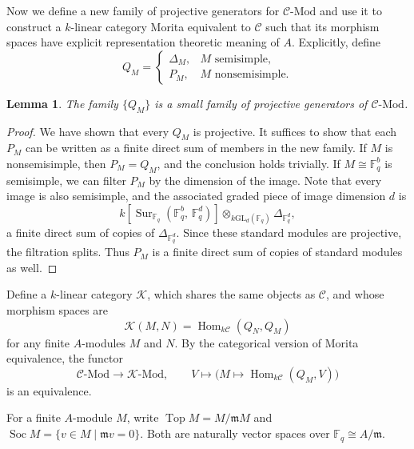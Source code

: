 \documentclass[10pt, reqno]{amsart}
\theoremstyle{plain}
\newtheorem{lemma}[theorem]{Lemma}
\numberwithin{equation}{section}
\theoremstyle{definition}
\newcommand{\Hom}{\operatorname{Hom}}
\newcommand{\Sur}{\operatorname{Sur}}
\newcommand{\Soc}{\operatorname{Soc}}
\newcommand{\Top}{\operatorname{Top}}
\newcommand{\Mod}{{\textrm{-}\mathrm{Mod}}}
\newcommand{\C}{\mathscr C}
\newcommand{\K}{\mathcal K}
\begin{document}
Now we define a new family of projective generators for $\C \Mod$ and use it to construct a $k$-linear category Morita equivalent to $\C$ such that its morphism spaces have explicit representation theoretic meaning of $A$. Explicitly, define
\[
Q_M=
\begin{cases}
\Delta_M, & M\text{ semisimple},\\
P_M, & M \text{ nonsemisimple}.
\end{cases}
\]

\begin{lemma} \label{lem:Q-generators}
The family $\{Q_M\}$ is a small family of projective generators of $\C \Mod$.
\end{lemma}

\begin{proof}
We have shown that every $Q_M$ is projective. It suffices to show that each $P_M$ can be written as a finite direct sum of members in the new family. If $M$ is nonsemisimple, then $P_M = Q_M$, and the conclusion holds trivially. If $M \cong \mathbb{F}_q^b$ is semisimple, we can filter $P_M$ by the dimension of the image. Note that every image is also semisimple, and the associated graded piece of image dimension $d$ is
\[
k[\Sur_{\mathbb{F}_q} (\mathbb{F}_q^b, \, \mathbb{F}_q^d)] \otimes_{k\mathrm{GL}_d(\mathbb{F}_q)} \Delta_{\mathbb{F}_q^d},
\]
a finite direct sum of copies of $\Delta_{\mathbb{F}_q^d}$. Since these standard modules are projective, the filtration splits. Thus $P_M$ is a finite direct sum of copies of standard modules as well.
\end{proof}

Define a $k$-linear category $\K$, which shares the same objects as $\C$, and whose morphism spaces are
\[
\K(M,N) = \Hom_{k\C}(Q_N, Q_M)
\]
for any finite $A$-modules $M$ and $N$. By the categorical version of Morita equivalence, the functor
\[
\C \Mod \longrightarrow \K \Mod, \qquad V \longmapsto \bigl(M \mapsto \Hom_{k\C}(Q_M, V) \bigr)
\]
is an equivalence.

For a finite $A$-module $M$, write $\Top M = M /\mathfrak{m} M$ and $\Soc M = \{v \in M \mid \mathfrak{m} v = 0 \}$. Both are naturally vector spaces over $\mathbb{F}_q \cong A/\mathfrak{m}$.
\end{document}
